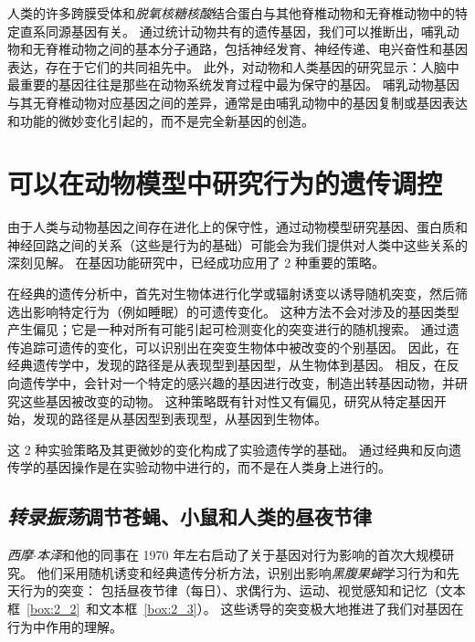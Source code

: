 人类的许多跨膜受体和\textit{脱氧核糖核酸}结合蛋白与其他脊椎动物和无脊椎动物中的特定直系同源基因有关。
通过统计动物共有的遗传基因，我们可以推断出，哺乳动物和无脊椎动物之间的基本分子通路，包括神经发育、神经传递、电兴奋性和基因表达，存在于它们的共同祖先中。
此外，对动物和人类基因的研究显示：人脑中最重要的基因往往是那些在动物系统发育过程中最为保守的基因。
哺乳动物基因与其无脊椎动物对应基因之间的差异，通常是由哺乳动物中的基因复制或基因表达和功能的微妙变化引起的，而不是完全新基因的创造。



\section{可以在动物模型中研究行为的遗传调控}

由于人类与动物基因之间存在进化上的保守性，通过动物模型研究基因、蛋白质和神经回路之间的关系（这些是行为的基础）可能会为我们提供对人类中这些关系的深刻见解。
在基因功能研究中，已经成功应用了 2 种重要的策略。


在经典的遗传分析中，首先对生物体进行化学或辐射诱变以诱导随机突变，然后筛选出影响特定行为（例如睡眠）的可遗传变化。
这种方法不会对涉及的基因类型产生偏见；它是一种对所有可能引起可检测变化的突变进行的随机搜索。 
通过遗传追踪可遗传的变化，可以识别出在突变生物体中被改变的个别基因。
因此，在经典遗传学中，发现的路径是从表现型到基因型，从生物体到基因。
相反，在反向遗传学中，会针对一个特定的感兴趣的基因进行改变，制造出转基因动物，并研究这些基因被改变的动物。
这种策略既有针对性又有偏见，研究从特定基因开始，发现的路径是从基因型到表现型，从基因到生物体。

这 2 种实验策略及其更微妙的变化构成了实验遗传学的基础。
通过经典和反向遗传学的基因操作是在实验动物中进行的，而不是在人类身上进行的。



\subsection{\textit{转录振荡}调节苍蝇、小鼠和人类的昼夜节律}

\textit{西摩$\cdot$本泽}和他的同事在 1970 年左右启动了关于基因对行为影响的首次大规模研究。
他们采用随机诱变和经典遗传分析方法，识别出影响\textit{黑腹果蝇}学习行为和先天行为的突变：
包括昼夜节律（每日）、求偶行为、运动、视觉感知和记忆（文本框~\ref{box:2_2}~和文本框~\ref{box:2_3}）。
这些诱导的突变极大地推进了我们对基因在行为中作用的理解。



